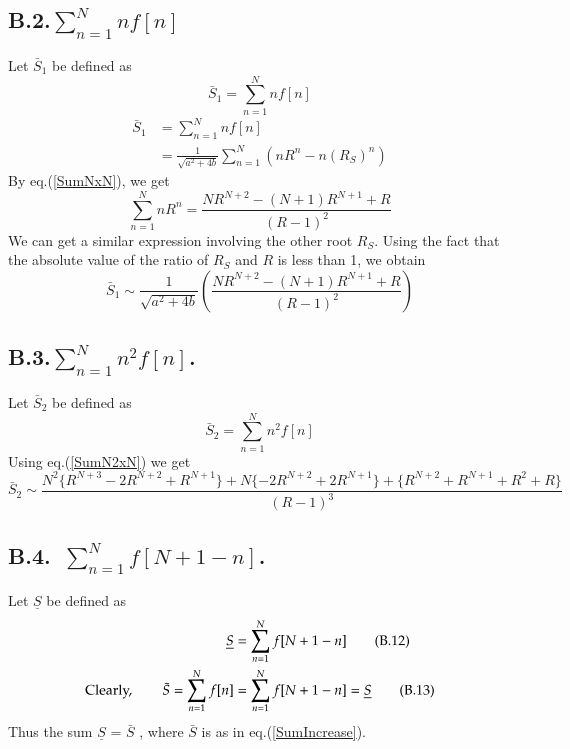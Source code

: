 \begin{multicols}{2}
\subsection*{B.2.\quad $\displaystyle{\sum_{n=1}^{N}n f[n]}$}\label{app-B-B.2}
Let $\bar{S}_1$ be defined as 
\begin{equation*}
\bar{S}_1 = \displaystyle{\sum_{n=1}^N nf[n]}\tag{B.7}\label{eq-B.7}
\end{equation*}
\begin{align*}
\bar{S}_1 &= \displaystyle{\sum_{n=1}^N nf[n]} \nonumber\\
&= \frac{1}{\sqrt{a^2 + 4b}} \displaystyle{\sum_{n=1}^N{(n R^n -  n(R_S)^n)}}\nonumber
\end{align*}
By eq.(\ref{SumNxN}), we get
\begin{equation*}
\displaystyle{\sum_{n=1}^N }nR^n = \frac{NR^{N+2}-(N+1)R^{N+1}+R}{(R-1)^2}\tag{B.8}\label{eq-B.8}
\end{equation*}
We can get a similar expression involving the other root $R_S$. Using the fact that the absolute value of the ratio of $R_S$ and $R$ is less than 1, we obtain 
\begin{equation*}
\bar{S}_1 \sim \frac{1}{\sqrt{a^2 + 4b}}\left(\frac{NR^{N+2}-(N+1)R^{N+1}+R}{(R-1)^2}\right)\tag{B.9}\label{eq-B.9}
\end{equation*}

\subsection*{B.3.\quad $\displaystyle{\sum_{n=1}^{N}n^2 f[n]}$.}
Let $\bar{S}_2$ be defined as
 \begin{equation*}
 \bar{S}_2 = \displaystyle{\sum_{n=1}^{N}n^2 f[n]}\tag{B.10}\label{eq-B.10}
 \end{equation*}
 Using eq.(\ref{SumN2xN}) we get 
 {\fontsize{5}{6}\selectfont\begin{equation*}
 \bar{S}_2 \sim \frac{N^2\{R^{N+3}-2R^{N+2}+R^{N+1}\}+N\{-2R^{N+2}+2R^{N+1}\}+ \{R^{N+2}+R^{N+1}+R^2+R\}}{(R-1)^3}\tag{B.11}\label{eq-B.11}
\end{equation*}}

\vspace{-.5cm}

\subsection*{B.4.~$\displaystyle{\sum_{n=1}^{N}f[N+1-n]}$.}
Let $\underline{S}$ be defined as
\begin{align*}
\underline{S} &= \displaystyle{\sum_{n=1}^{N}f[N+1-n]}\tag{B.12}\label{eq-B.12}\\
\textup{Clearly,} \hspace{0.3in} \bar{S} = \displaystyle{\sum_{n=1}^{N}f[n]} &= \displaystyle{\sum_{n=1}^{N}f[N+1-n]} = \underline{S}\tag{B.13}\label{eq-B.13}
\end{align*}
Thus the sum $\underline{S}$ = $\bar{S}$ , where $\bar{S}$ is as in eq.(\ref{SumIncrease}).


\end{multicols}
